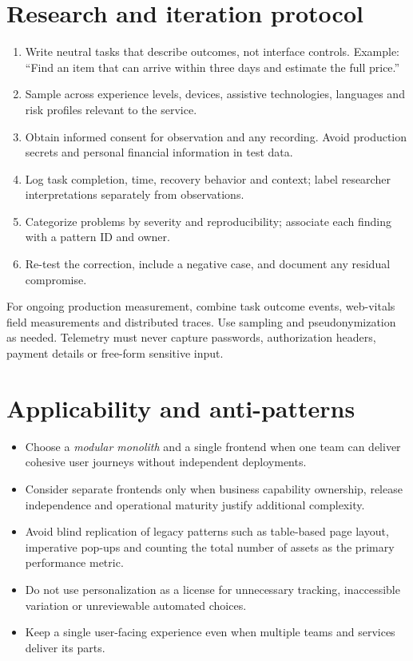 \documentclass[11pt]{article}
\begin{document}
\section{Research and iteration protocol}

\begin{enumerate}
\item Write neutral tasks that describe outcomes, not interface controls. Example: ``Find an item that can arrive within three days and estimate the full price.''
\item Sample across experience levels, devices, assistive technologies, languages and risk profiles relevant to the service.
\item Obtain informed consent for observation and any recording. Avoid production secrets and personal financial information in test data.
\item Log task completion, time, recovery behavior and context; label researcher interpretations separately from observations.
\item Categorize problems by severity and reproducibility; associate each finding with a pattern ID and owner.
\item Re-test the correction, include a negative case, and document any residual compromise.
\end{enumerate}
\begin{modernbox}
For ongoing production measurement, combine task outcome events, web-vitals field measurements and distributed traces. Use sampling and pseudonymization as needed. Telemetry must never capture passwords, authorization headers, payment details or free-form sensitive input.
\end{modernbox}

\section{Applicability and anti-patterns}
\begin{itemize}
\item Choose a \emph{modular monolith} and a single frontend when one team can deliver cohesive user journeys without independent deployments.
\item Consider separate frontends only when business capability ownership, release independence and operational maturity justify additional complexity.
\item Avoid blind replication of legacy patterns such as table-based page layout, imperative pop-ups and counting the total number of assets as the primary performance metric.
\item Do not use personalization as a license for unnecessary tracking, inaccessible variation or unreviewable automated choices.
\item Keep a single user-facing experience even when multiple teams and services deliver its parts.
\end{itemize}


\clearpage

\end{document}
